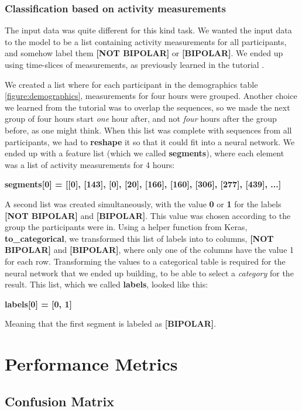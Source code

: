 \subsubsection{Classification based on activity measurements}

The input data was quite different for this kind task. We wanted the input data to the model to be a list containing activity measurements for all participants,
and somehow label them \textbf{[NOT BIPOLAR]} or \textbf{[BIPOLAR]}. We ended up using time-slices of measurements, 
as previously learned in the tutorial \cite{1d_cnn}.

We created a list where for each participant in the demographics table \ref{figure:demographics}, measurements for four hours were grouped. 
Another choice we learned from the tutorial was to overlap the sequences, so we made the next group of four hours start \textit{one} hour after, 
and not \textit{four} hours after the group before, as one might think. When this list was complete with sequences from all participants, we 
had to \textbf{reshape} it so that it could fit into a neural network. We ended up with a feature list (which we called \textbf{segments}), 
where each element was a list of activity measurements for 4 hours: 

\textbf{segments[0] = [[0], [143], [0], [20], [166], [160], [306], [277], [439], ...]}

\noindent A second list was created simultaneously, with the value \textbf{0} or \textbf{1} for the labels \textbf{[NOT BIPOLAR]} and \textbf{[BIPOLAR]}.
This value was chosen according to the group the participants were in. Using a helper function from Keras, \textbf{to\_categorical}, we transformed this 
list of labels into to columns, \textbf{[NOT BIPOLAR]} and \textbf{[BIPOLAR]}, where only one of the columns have the value 1 for each row. Transforming 
the values to a categorical table is required for the neural network that we ended up building, to be able to select a \textit{category} for the result. 
This list, which we called \textbf{labels}, looked like this: 

\textbf{labels[0] = [0, 1]}

\noindent Meaning that the first segment is labeled as \textbf{[BIPOLAR]}.

\section{Performance Metrics}
\subsection{Confusion Matrix}

